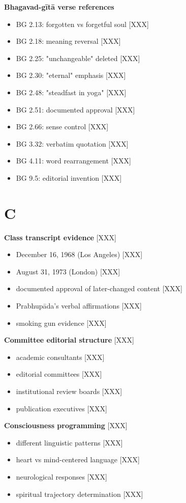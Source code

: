 \documentclass[11pt,twoside]{book}
\begin{document}
\textbf{\textbf{Bhagavad-gītā verse references}}
\begin{itemize}
\item BG 2.13: forgotten vs forgetful soul [XXX]
\item BG 2.18: meaning reversal [XXX]
\item BG 2.25: "unchangeable" deleted [XXX]
\item BG 2.30: "eternal" emphasis [XXX]
\item BG 2.48: "steadfast in yoga" [XXX]
\item BG 2.51: documented approval [XXX]
\item BG 2.66: sense control [XXX]
\item BG 3.32: verbatim quotation [XXX]
\item BG 4.11: word rearrangement [XXX]
\item BG 9.5: editorial invention [XXX]
\end{itemize}
\section*{C}
\label{sec:orgc92a445}

\textbf{\textbf{Class transcript evidence}} {[}XXX]
\begin{itemize}
\item December 16, 1968 (Los Angeles) [XXX]
\item August 31, 1973 (London) [XXX]
\item documented approval of later-changed content [XXX]
\item Prabhupāda's verbal affirmations [XXX]
\item smoking gun evidence [XXX]
\end{itemize}

\textbf{\textbf{Committee editorial structure}} {[}XXX]
\begin{itemize}
\item academic consultants [XXX]
\item editorial committees [XXX]
\item institutional review boards [XXX]
\item publication executives [XXX]
\end{itemize}

\textbf{\textbf{Consciousness programming}} {[}XXX]
\begin{itemize}
\item different linguistic patterns [XXX]
\item heart vs mind-centered language [XXX]
\item neurological responses [XXX]
\item spiritual trajectory determination [XXX]
\end{itemize}
\end{document}

